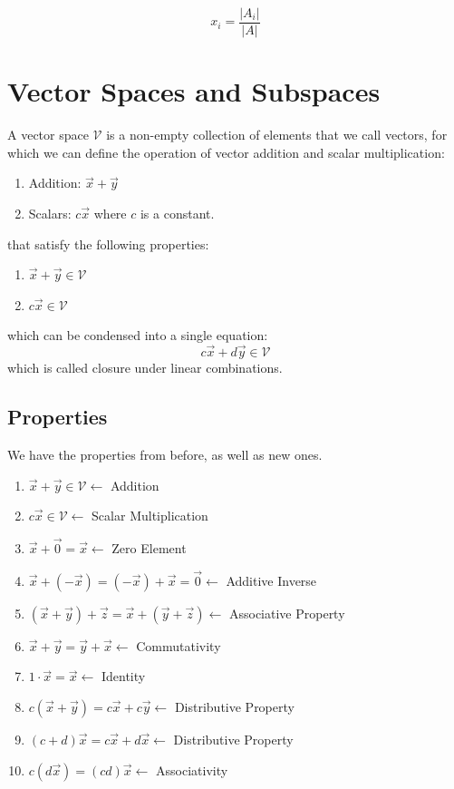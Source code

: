        \begin{equation}\label{eq:cramer}
            x_i = \frac{|A_i|}{|A|}
        \end{equation}


\section{Vector Spaces and Subspaces}
A vector space $\mathcal{V}$ is a non-empty collection of elements that we call vectors, for which we can define the operation of vector addition and scalar multiplication:
    \begin{enumerate}
    \item Addition: $\vec{x} + \vec{y}$
    \item Scalars: $c \vec{x}$ where $c$ is a constant.
    \end{enumerate}
that satisfy the following properties:
    \begin{enumerate}
    \item $\vec{x} + \vec{y} \in \mathcal{V}$
    \item $c \vec{x} \in \mathcal{V}$
    \end{enumerate}

which can be condensed into a single equation:
\[
    c\vec{x} + d\vec{y} \in \mathcal{V}
\]
which is called closure under linear combinations.

    \subsection{Properties}
    We have the properties from before, as well as new ones.

    \begin{enumerate}
    \item $\vec{x} + \vec{y} \in \mathcal{V} \leftarrow $ Addition
    \item $c \vec{x} \in \mathcal{V} \leftarrow $ Scalar Multiplication
    \item $\vec{x} + \vec{0} = \vec{x} \leftarrow $ Zero Element
    \item $\vec{x} + (-\vec{x}) = (-\vec{x}) + \vec{x} = \vec{0} \leftarrow $ Additive Inverse
    \item $(\vec{x} + \vec{y}) + \vec{z} = \vec{x} + (\vec{y} + \vec{z}) \leftarrow$ Associative Property
    \item $\vec{x} + \vec{y} = \vec{y} + \vec{x} \leftarrow $ Commutativity
    \item $1 \cdot \vec{x} = \vec{x} \leftarrow$ Identity
    \item $c (\vec{x} + \vec{y}) = c\vec{x} + c\vec{y} \leftarrow $ Distributive Property
    \item $(c + d) \vec{x} = c\vec{x} + d\vec{x} \leftarrow $ Distributive Property
    \item $c(d\vec{x}) = (cd)\vec{x} \leftarrow $ Associativity
    \end{enumerate}

